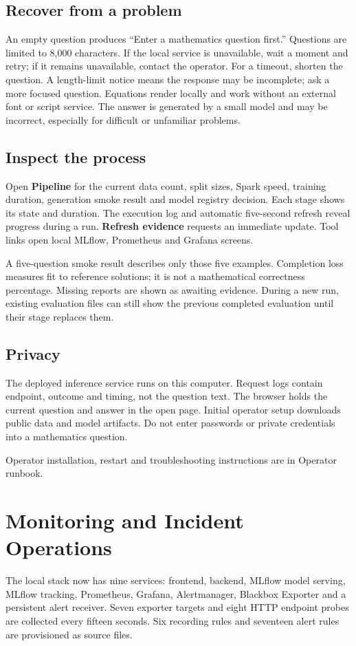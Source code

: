 \documentclass[11pt,a4paper]{article}
\begin{document}
\subsection*{Recover from a problem}
An empty question produces “Enter a mathematics question first.” Questions are limited to 8,000 characters. If the local service is unavailable, wait a moment and retry; if it remains unavailable, contact the operator. For a timeout, shorten the question. A length-limit notice means the response may be incomplete; ask a more focused question. Equations render locally and work without an external font or script service. The answer is generated by a small model and may be incorrect, especially for difficult or unfamiliar problems.

\subsection*{Inspect the process}
Open \textbf{Pipeline} for the current data count, split sizes, Spark speed, training duration, generation smoke result and model registry decision. Each stage shows its state and duration. The execution log and automatic five-second refresh reveal progress during a run. \textbf{Refresh evidence} requests an immediate update. Tool links open local MLflow, Prometheus and Grafana screens.

A five-question smoke result describes only those five examples. Completion loss measures fit to reference solutions; it is not a mathematical correctness percentage. Missing reports are shown as awaiting evidence. During a new run, existing evaluation files can still show the previous completed evaluation until their stage replaces them.

\subsection*{Privacy}
The deployed inference service runs on this computer. Request logs contain endpoint, outcome and timing, not the question text. The browser holds the current question and answer in the open page. Initial operator setup downloads public data and model artifacts. Do not enter passwords or private credentials into a mathematics question.

Operator installation, restart and troubleshooting instructions are in Operator runbook.

\clearpage
\section*{Monitoring and Incident Operations}
The local stack now has nine services: frontend, backend, MLflow model serving, MLflow tracking, Prometheus, Grafana, Alertmanager, Blackbox Exporter and a persistent alert receiver. Seven exporter targets and eight HTTP endpoint probes are collected every fifteen seconds. Six recording rules and seventeen alert rules are provisioned as source files.
\end{document}
